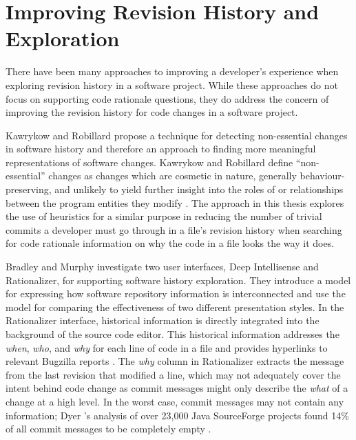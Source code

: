\section{Improving Revision History and Exploration}

There have been many approaches to improving a developer's experience when exploring revision history in a software project. While these approaches do not focus on supporting code rationale questions, they do address the concern of improving the revision history for code changes in a software project.

Kawrykow and Robillard \cite{kawrykow_non-essential_2011} propose a technique for detecting non-essential changes in software history and therefore an approach to finding more meaningful representations of software changes.
Kawrykow and Robillard define ``non-essential'' changes as changes which are cosmetic in nature, generally behaviour-preserving, and unlikely to yield further insight into the roles of or relationships between the program entities they modify \cite{kawrykow_non-essential_2011}. 
The approach in this thesis explores the use of heuristics for a similar purpose in reducing the number of trivial commits a developer must go through in a file's revision history when searching for code rationale information on why the code in a file looks the way it does.

Bradley and Murphy \cite{bradley_supporting_2011} investigate two user interfaces, Deep Intellisense and Rationalizer, for supporting software history exploration.
They introduce a model for expressing how software repository information is interconnected and use the model for comparing the effectiveness of two different presentation styles.
In the Rationalizer interface, historical information is directly integrated into the background of the source code editor.
This historical information addresses the \emph{when}, \emph{who}, and \emph{why} for each line of code in a file and provides hyperlinks to relevant Bugzilla reports \cite{bradley_supporting_2011}.
The \emph{why} column in Rationalizer extracts the message from the last revision that modified a line, which may not adequately cover the intent behind code change as commit messages might only describe the \emph{what} of a change at a high level.
In the worst case, commit messages may not contain any information; Dyer \etal's analysis of over 23,000 Java SourceForge projects found 14\% of all commit messages to be completely empty \cite{dyer_boa_2013}.

